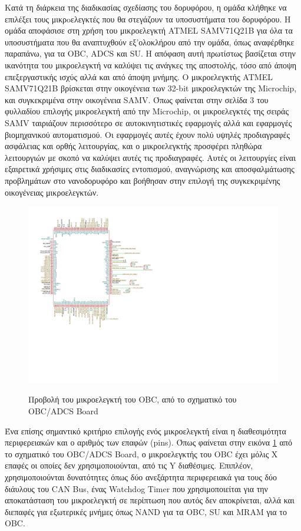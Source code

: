 \documentclass[a4paper,nobib,justified]{tufte-book}
\begin{document}
Κατά τη διάρκεια της διαδικασίας σχεδίασης του δορυφόρου, η ομάδα κλήθηκε να επιλέξει τους μικρoελεγκτές που θα στεγάζουν τα υποσυστήματα του δορυφόρου. Η ομάδα αποφάσισε στη χρήση του μικροελεγκτή ATMEL SAMV71Q21B για όλα τα υποσυστήματα που θα αναπτυχθούν εξ'ολοκλήρου από την ομάδα, όπως αναφέρθηκε παραπάνω, για τα OBC, ADCS και SU. Η απόφαση αυτή πρωτίστως βασίζεται στην ικανότητα του μικροελεγκτή να καλύψει τις ανάγκες της αποστολής, τόσο από άποψη επεξεργαστικής ισχύς αλλά και από άποψη μνήμης. Ο μικροελεγκτής ATMEL SAMV71Q21B βρίσκεται στην οικογένεια των 32-bit μικροελεγκτών της Microchip, και συγκεκριμένα στην οικογένεια SAMV. Όπως φαίνεται στην σελίδα 3 του φυλλαδίου επιλογής μικροελεγκτή από την Microchip, οι μικροελεγκτές της σειράς SAMV ταιριάζουν περισσότερο σε αυτοκινητιστικές εφαρμογές αλλά και εφαρμογές βιομηχανικού αυτοματισμού. Οι εφαρμογές αυτές έχουν πολύ υψηλές προδιαγραφές ασφάλειας και ορθής λειτουργίας, και ο μικροελεγκτής προσφέρει πληθώρα λειτουργιών με σκοπό να καλύψει αυτές τις προδιαγραφές. Αυτές οι λειτουργίες είναι εξαιρετικά χρήσιμες στις διαδικασίες εντοπισμού, αναγνώρισης και αποσφαλμάτωσης προβλημάτων στο νανοδορυφόρο και βοήθησαν στην επιλογή της συγκεκριμένης οικογένειας μικροελεγκτών.

\begin{figure}[hb]
	\includegraphics[width=0.8\linewidth]{media/diagrams/obc-mcu-schematic.pdf}
	\label{diag:obc-mcu-schematic}
	\caption{Προβολή του μικροελεγκτή του OBC, από το σχηματικό του OBC/ADCS Board}
\end{figure}

Ένα επίσης σημαντικό κριτήριο επιλογής ενός μικροελεγκτή είναι η διαθεσιμότητα περιφερειακών και ο αριθμός των επαφών (pins). Όπως φαίνεται στην εικόνα \ref*{diag:obc-mcu-schematic} από το σχηματικό του OBC/ADCS Board, ο μικροελεγκτής του OBC έχει μόλις X επαφές οι οποίες δεν χρησιμοποιούνται, από τις Y διαθέσιμες. Επιπλέον, χρησιμοποιούνται δυνατότητες όπως δύο ανεξάρτητα περιφερειακά για τους δύο διάυλους του CAN Bus, ένας Watchdog Timer που χρησιμοποιείται για την αποκατάσταση του μικροελεγκτή σε περίπτωση που αυτός δεν αποκρίνεται, αλλά και διεπαφές για εξωτερικές μνήμες όπως NAND για τα OBC, SU και MRAM για το OBC.  %
\end{document}
